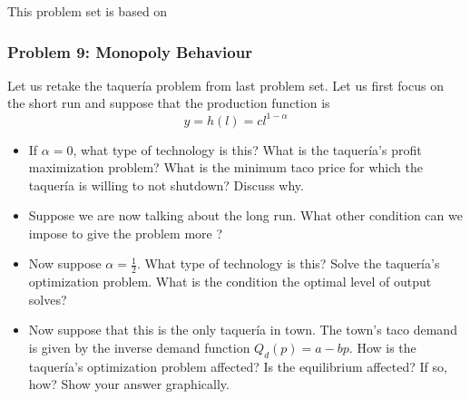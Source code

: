 \documentclass{article}
\begin{document}
This problem set is based on  \cite{Valrian_Inter_Micro}

\subsubsection*{Problem 9: Monopoly Behaviour }
 Let us retake the taquer\'ia problem from last problem set.
 Let us first focus on the short run and suppose that the
 production function is
\begin{equation*}
  y = h(l) = cl^{1-\alpha}
\end{equation*}

\begin{itemize}
  \item If \(\alpha =0\), what type of technology is this? What is the taquer\'ia's
  profit maximization problem? What is the minimum taco price for which
  the taquer\'ia is willing to not shutdown? Discuss why.
  \item Suppose we are now talking about the long run. What other condition can we impose to
  give the problem more ?
  \item Now suppose \(\alpha = \frac{1}{2}\). What type of technology is this? Solve
  the taquer\'ia's optimization problem. What is the condition the optimal level
  of output solves?
  \item Now suppose that this is the only taquer\'ia in town. The town's taco demand
  is given by the inverse demand function \(Q_d(p) = a-bp\). How is the taquer\'ia's
  optimization problem affected? Is the equilibrium affected? If so, how? Show your
  answer graphically.
\end{itemize}
\newpage

\printbibliography
\end{document}
